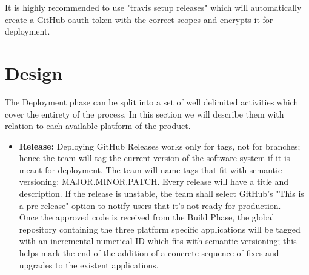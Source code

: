 \documentclass[12pt]{report}
\begin{document}
It is highly recommended to use "travis setup releases" which will automatically create a GitHub oauth token with the correct scopes and encrypts it for deployment.

\section{Design}
The Deployment phase can be split into a set of well delimited activities which cover the entirety of the process. In this section we will describe them with relation to each available platform of the product.

\begin{itemize}
   \item \textbf{Release:}
   Deploying GitHub Releases works only for tags, not for branches; hence the team will tag the current version of the software system if it is meant for deployment. The team will name tags that fit with semantic versioning: MAJOR.MINOR.PATCH. Every release will have a title and description. If the release is unstable, the team shall select GitHub's "This is a pre-release" option to notify users that it's not ready for production.\\
   
   Once the approved code is received from the Build Phase, the global repository containing the three platform specific applications will be tagged with an incremental numerical ID which fits with semantic versioning; this helps mark the end of the addition of a concrete sequence of fixes and upgrades to the existent applications. 
   

\end{itemize}
\end{document}
